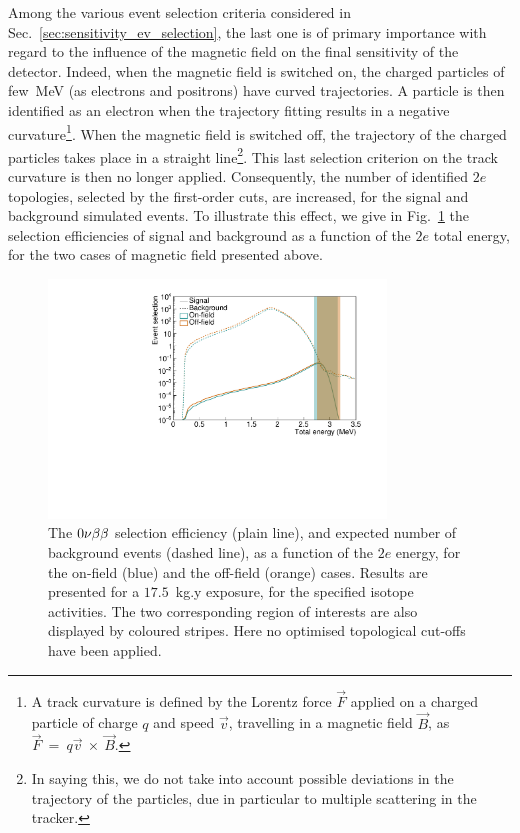Among the various event selection criteria considered in Sec.~\ref{sec:sensitivity_ev_selection}, the last one is of primary importance with regard to the influence of the magnetic field on the final sensitivity of the detector.
Indeed, when the magnetic field is switched on, the charged particles of few~MeV (as electrons and positrons) have curved trajectories.
A particle is then identified as an electron when the trajectory fitting results in a negative curvature\footnote{A track curvature is defined by the Lorentz force $\overrightarrow{F}$ applied on a charged particle of charge $q$ and speed $\overrightarrow{v}$, travelling in a magnetic field $\overrightarrow{B}$, as $\overrightarrow{F}~=~q\overrightarrow{v}~\times~\overrightarrow{B}$.}.
When the magnetic field is switched off, the trajectory of the charged particles takes place in a straight line\footnote{In saying this, we do not take into account possible deviations in the trajectory of the particles, due in particular to multiple scattering in the tracker.}.
This last selection criterion on the track curvature is then no longer applied.
Consequently, the number of identified $2e$ topologies, selected by the first-order cuts, are increased, for the signal and background simulated events.
To illustrate this effect, we give in Fig.~\ref{fig:eff_0nu_w_wo_B} the selection efficiencies of signal and background as a function of the $2e$ total energy, for the two cases of magnetic field presented above.
\begin{figure}[h]
  \centering
  \includegraphics[width=0.8\textwidth]{Sensitivity/fig_sensitivity/Nbkg_field.pdf}
  \caption{The $0\nu\beta\beta$ selection efficiency (plain line), and expected number of background events (dashed line), as a function of the $2e$ energy, for the on-field (blue) and the off-field (orange) cases.
    Results are presented for a $17.5$~kg.y exposure, for the specified isotope activities.
    The two corresponding region of interests are also displayed by coloured stripes.
    Here no optimised topological cut-offs have been applied.
    \label{fig:eff_0nu_w_wo_B}}
\end{figure}
